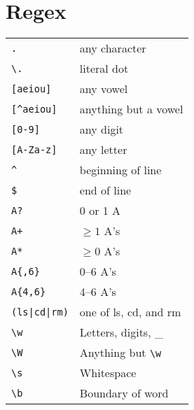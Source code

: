 \documentclass[a4paper, twocolumn]{article}
\begin{document}
\section{Regex}
\begin{tabular}{ll}
    \verb|.|            & any character                             \\
    \verb|\.|           & literal dot                               \\
    \verb|[aeiou]|      & any vowel                                 \\
    \verb|[^aeiou]|     & anything but a vowel                      \\
    \verb|[0-9]|        & any digit                                 \\
    \verb|[A-Za-z]|     & any letter                                \\
    \verb|^|            & beginning of line                         \\
    \verb|$|            & end of line                               \\
    \verb|A?|           & 0 or 1 A                                  \\
    \verb|A+|           & $\ge 1$ A's                               \\
    \verb|A*|           & $\ge 0$ A's                               \\
    \verb|A{,6}|        & 0--6 A's                                  \\
    \verb|A{4,6}|       & 4--6 A's                                  \\
    \verb!(ls|cd|rm)!   & one of ls, cd, and rm                     \\
    \verb|\w|           & Letters, digits, \_                       \\
    \verb|\W|           & Anything but \verb|\w|                    \\
    \verb|\s|           & Whitespace                                \\
    \verb|\b|           & Boundary of word
\end{tabular}
\end{document}
